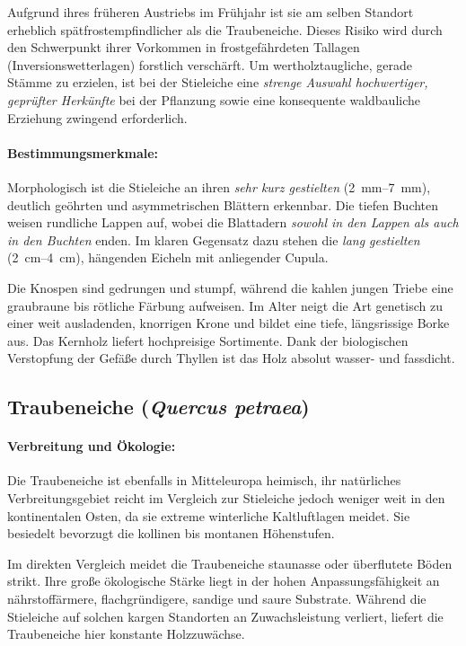 \documentclass[twocolumn, bibliography=totoc, abstract=true]{scrartcl}
\begin{document}
Aufgrund ihres früheren Austriebs im Frühjahr ist sie am selben Standort erheblich spätfrostempfindlicher als die Traubeneiche. Dieses Risiko wird durch den Schwerpunkt ihrer Vorkommen in frostgefährdeten Tallagen (Inversionswetterlagen) forstlich verschärft. Um wertholztaugliche, gerade Stämme zu erzielen, ist bei der Stieleiche eine \emph{strenge Auswahl hochwertiger, geprüfter Herkünfte} bei der Pflanzung sowie eine konsequente waldbauliche Erziehung zwingend erforderlich.

\paragraph{Bestimmungsmerkmale:} 
Morphologisch ist die Stieleiche an ihren \emph{sehr kurz gestielten} (\qtyrange{2}{7}{\mm}), deutlich geöhrten und asymmetrischen Blättern erkennbar. Die tiefen Buchten weisen rundliche Lappen auf, wobei die Blattadern \emph{sowohl in den Lappen als auch in den Buchten} enden. Im klaren Gegensatz dazu stehen die \emph{lang gestielten} (\qtyrange{2}{4}{\cm}), hängenden Eicheln mit anliegender Cupula. 

Die Knospen sind gedrungen und stumpf, während die kahlen jungen Triebe eine graubraune bis rötliche Färbung aufweisen. Im Alter neigt die Art genetisch zu einer weit ausladenden, knorrigen Krone und bildet eine tiefe, längsrissige Borke aus. Das Kernholz liefert hochpreisige Sortimente. Dank der biologischen Verstopfung der Gefäße durch Thyllen ist das Holz absolut wasser- und fassdicht.

\subsection{Traubeneiche (\textit{Quercus petraea})}

\paragraph{Verbreitung und Ökologie:} 
Die Traubeneiche ist ebenfalls in Mitteleuropa heimisch, ihr natürliches Verbreitungsgebiet reicht im Vergleich zur Stieleiche jedoch weniger weit in den kontinentalen Osten, da sie extreme winterliche Kaltluftlagen meidet. Sie besiedelt bevorzugt die kollinen bis montanen Höhenstufen.

Im direkten Vergleich meidet die Traubeneiche staunasse oder überflutete Böden strikt. Ihre große ökologische Stärke liegt in der hohen Anpassungsfähigkeit an nährstoffärmere, flachgründigere, sandige und saure Substrate. Während die Stieleiche auf solchen kargen Standorten an Zuwachsleistung verliert, liefert die Traubeneiche hier konstante Holzzuwächse.
\end{document}

